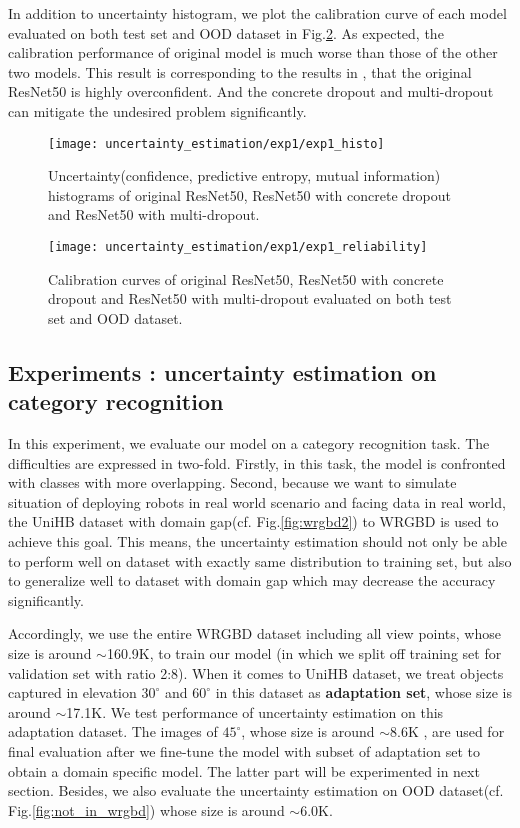 In addition to uncertainty histogram, we plot the calibration curve of each model evaluated on both test set and OOD dataset in Fig.\ref{exp1_reliability}. As expected, the calibration performance of original model is much worse than those of the other two models. This result is corresponding to the results in \cite{guo2017calibration}, that the original ResNet50 is highly overconfident. And the concrete dropout and multi-dropout can mitigate the undesired problem significantly.

\begin{figure}[H]
	\begin{center}
		\texttt{[image: uncertainty\_estimation/exp1/exp1\_histo]}
		\caption{Uncertainty(confidence, predictive entropy, mutual information) histograms of original ResNet50, ResNet50 with concrete dropout and ResNet50 with multi-dropout.}		
		\label{exp1_histo}
	\end{center}
\end{figure}
\begin{figure}[H]
	\begin{center}
		\texttt{[image: uncertainty\_estimation/exp1/exp1\_reliability]}
		\caption{Calibration curves of original ResNet50, ResNet50 with concrete dropout and ResNet50 with multi-dropout evaluated on both test set and OOD dataset.}		
		\label{exp1_reliability}
	\end{center}
\end{figure}

\subsection{Experiments : uncertainty estimation on category recognition}
In this experiment, we evaluate our model on a category recognition task. The difficulties are expressed in two-fold. Firstly, in this task, the model is confronted with classes with more overlapping. Second, because we want to simulate situation of deploying robots in real world scenario and facing data in real world, the UniHB dataset with domain gap(cf. Fig.\ref{fig:wrgbd2}) to WRGBD is used to achieve this goal. This means, the uncertainty estimation should not only be able to perform well on dataset with exactly same distribution to training set, but also to generalize well to dataset with domain gap which may decrease the accuracy significantly.

Accordingly, we use the entire WRGBD dataset including all view points, whose size is around $\sim$160.9K, to train our model (in which we split off training set for validation set with ratio 2:8). When it comes to UniHB dataset, we treat objects captured in elevation $30^\circ$ and $60^\circ$ in this dataset as \textbf{adaptation set}, whose size is around $\sim$17.1K. We test performance of uncertainty estimation on this adaptation dataset. The images of $45^\circ$, whose size is around $\sim$8.6K , are used for final evaluation after we fine-tune the model with subset of adaptation set to obtain a domain specific model. The latter part will be experimented in next section. Besides, we also evaluate the uncertainty estimation on OOD dataset(cf. Fig.\ref{fig:not_in_wrgbd}) whose size is around $\sim$6.0K. 

